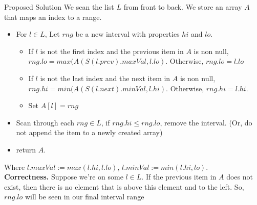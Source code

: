 \documentclass[11pt]{article}
\begin{document}
\begin{section}{Proposed Solution}
We scan the list $L$ from front to back. We store an array $A$ that maps an index to a range. 
\begin{itemize}
\item For $l\in L$, Let $rng$ be a new interval with properties $hi$ and $lo$. 
\begin{itemize}
\item If $l$ is not the first index and the previous item in $A$ is non null, $rng.lo = max(A(S(l.prev).maxVal, l.lo)$. Otherwise, $rng.lo = l.lo$
\item If $l$ is not the last index and the next item in $A$ is non null, $rng.hi = min(A(S(l.next).minVal, l.hi)$. Otherwise, $rng.hi = l.hi$.
\item Set $A[l] = rng$
\end{itemize}
\item Scan through each $rng \in L$, if $rng.hi \le rng.lo$, remove the interval. (Or, do not append the item to a newly created array)
\item return $A$.
\end{itemize}
Where $l.maxVal := max(l.hi, l.lo)$, $l.minVal := min(l.hi, lo)$.\\

\textbf{Correctness.} Suppose we're on some $l\in L$. If the previous item in $A$ does not exist, then there is no element that is above 
this element and to the left. So, $rng.lo$ will be seen in our final interval range











\end{section}
\end{document}
